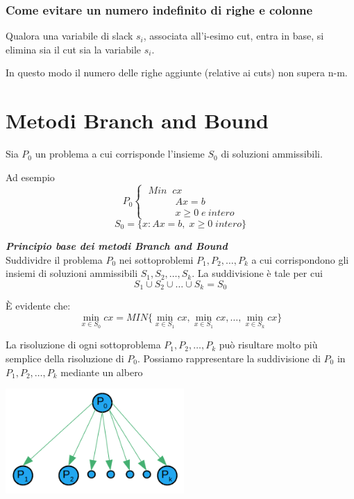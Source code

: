 \subsubsection{Come evitare un numero indefinito di righe e colonne}
Qualora una variabile di slack $s_{i}$, associata all'i-esimo cut, entra in base, si elimina sia il cut sia la variabile $s_{i}$.

In questo modo il numero delle righe aggiunte (relative ai cuts) non supera n-m.

\section{Metodi Branch and Bound}
Sia $P_{0}$ un problema a cui corrisponde l'insieme $S_{0}$ di soluzioni ammissibili.

Ad esempio
\begin{displaymath}
P_{0}
\begin{cases}
\;Min\;\;cx\\
\;\;\;\;\;\;\;\;\;\;\;A x = b\\
\;\;\;\;\;\;\;\;\;\;\;x \ge 0\;e\:intero
\end{cases}
\end{displaymath}
\begin{equation}
	S_{0}=\{x:Ax=b,\;x\ge 0\;intero\}
\end{equation}

\noindent
\emph{\textbf{Principio base dei metodi Branch and Bound}}
\\
Suddividre il problema $P_{0}$ nei sottoproblemi $P_{1},P_{2},\dots,P_{k}$ a cui corrispondono gli insiemi di soluzioni ammissibili $S_{1},S_{2},\dots,S_{k}$. La suddivisione è tale per cui 
\begin{equation}
S_{1} \cup S_{2} \cup \dots \cup S_{k} = S_{0}
\end{equation}

È evidente che:
\begin{equation}
\min_{x \in S_{0}} cx = MIN\{\min_{x\in S_{1}} cx, \min_{x\in S_{1}}cx,\dots,\min_{x\in S_{k}}cx\}
\end{equation}

La risoluzione di ogni sottoproblema $P_{1},P_{2},\dots,P_{k}$ può risultare molto più semplice della risoluzione di $P_{0}$.
\newpage
Possiamo rappresentare la suddivisione di $P_{0}$ in $P_{1},P_{2},\dots,P_{k}$ mediante un albero

\centerline{\includegraphics[height=4cm]{images/graph14.png}}

